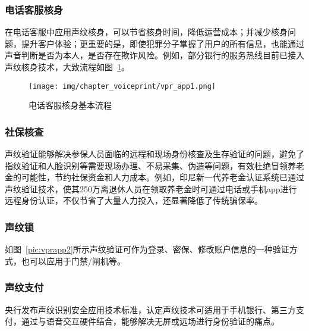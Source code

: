 \documentclass[graybox,envcountchap,sectrefs]{svmono}
\begin{document}
\subsubsection{电话客服核身}
在电话客服中应用声纹核身，可以节省核身时间，降低运营成本；并减少核身问题，提升客户体验；更重要的是，即使犯罪分子掌握了用户的所有信息，也能通过声音判断是否为本人，是否存在欺诈风险。例如，部分银行的服务热线目前已接入声纹核身技术，大致流程如图~\ref{pic:vprapp1}。

\begin{figure}[h!]
	\begin{center}
		\texttt{[image: img/chapter\_voiceprint/vpr\_app1.png]}
		\caption{电话客服核身基本流程}
		\label{pic:vprapp1}
	\end{center}
\end{figure}

\subsubsection{社保核查}
声纹验证能够解决参保人员面临的远程和现场身份核查及生存验证的问题，避免了指纹验证和人脸识别等需要现场办理、不易采集、伪造等问题，有效杜绝冒领养老金的可能性，节约社保资金和人力成本。例如，印尼新一代养老金认证系统已通过声纹验证技术，使其250万离退休人员在领取养老金时可通过电话或手机app进行远程身份认证，不仅节省了大量人力投入，还显著降低了传统骗保率。

\subsubsection{声纹锁}
如图~\ref{pic:vprapp2}所示声纹验证可作为登录、密保、修改账户信息的一种验证方式，也可以应用于门禁/闸机等。

\begin{figure*}
	\centering
	\caption{声纹锁样例}
	\label{pic:vprapp2}
\end{figure*}

\subsubsection{声纹支付}

央行发布声纹识别安全应用技术标准，认定声纹技术可适用于手机银行、第三方支付，通过与语音交互硬件结合，能够解决无屏或远场进行身份验证的痛点。
\begin{figure*}
	\centering
	\caption{声纹支付样例}
	\label{pic:vprapp3}
\end{figure*}
\end{document}
